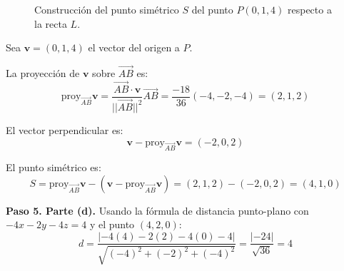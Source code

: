 \begin{prob}
\begin{myproof}
\begin{figure}[H]
\caption{Construcción del punto simétrico $S$ del punto $P(0,1,4)$ respecto a la recta $L$.}
\label{fig:mediatriz_simetrico}
\end{figure}


Sea $\mathbf{v}=(0,1,4)$ el vector del origen a $P$.

La proyección de $\mathbf{v}$ sobre $\overrightarrow{AB}$ es:
$$\text{proy}_{\overrightarrow{AB}} \mathbf{v}=\frac{\overrightarrow{AB} \cdot \mathbf{v}}{||\overrightarrow{AB}||^2} \overrightarrow{AB}=\frac{-18}{36} (-4,-2,-4) = (2,1,2)$$

El vector perpendicular es:
$$\mathbf{v}-\text{proy}_{\overrightarrow{AB}} \mathbf{v}=(-2,0,2)$$



El punto simétrico es:
$$S=\text{proy}_{\overrightarrow{AB}} \mathbf{v}-(\mathbf{v}-\text{proy}_{\overrightarrow{AB}} \mathbf{v})=(2,1,2)-(-2,0,2)=\boxed{(4,1,0)}$$

\textbf{Paso 5. Parte (d).} Usando la fórmula de distancia punto-plano con $-4x-2y-4z=4$ y el punto $(4,2,0)$:
$$d=\frac{|-4(4)-2(2)-4(0)-4|}{\sqrt{(-4)^2+(-2)^2+(-4)^2}}=\frac{|-24|}{\sqrt{36}}=\boxed{4}$$
\end{myproof} 
\end{prob}

